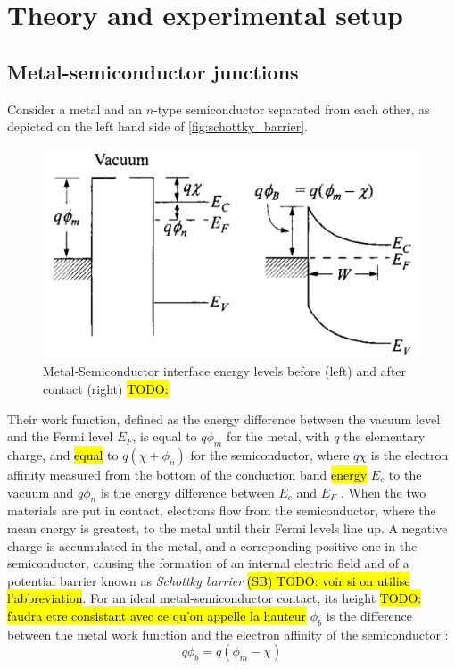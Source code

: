\section{Theory and experimental setup}
\subsection{Metal-semiconductor junctions}
Consider a metal and an $n$-type semiconductor separated from each other, as depicted on the left hand side of \autoref{fig:schottky_barrier}.
\begin{figure}[htbp]
    \centering
    \includegraphics[width=12cm]{figures/schottky_barrier.png}
    \caption{Metal-Semiconductor interface energy levels before (left) and after contact (right) \hl{TODO:} \cite{}}
    \label{fig:schottky_barrier}
\end{figure}
Their work function, defined as the energy difference between the vacuum level and the Fermi level $E_F$, is equal to $q \phi_m$ for the metal, with $q$ the elementary charge, and \hl{equal} to $q (\chi + \phi_n)$ for the semiconductor, where $q \chi$ is the electron affinity measured from the bottom of the conduction band \hl{energy} $E_c$ to the vacuum and $q\phi_n$ is the energy difference between $E_c$ and $E_F$ \cite{sze_physics_2007}.
When the two materials are put in contact, electrons flow from the semiconductor, where the mean energy is greatest, to the metal until their Fermi levels line up.
A negative charge is accumulated in the metal, and a correponding positive one in the semiconductor, causing the formation of an internal electric field and of a potential barrier known as \emph{Schottky barrier} \hl{(SB) TODO: voir si on utilise l'abbreviation}.
For an ideal metal-semiconductor contact, its height \hl{TODO: faudra etre consistant avec ce qu'on appelle la hauteur} $\phi_b$ is the difference between the metal work function and the electron affinity of the semiconductor \cite{sze_physics_2007}:
\begin{equation} \label{eq:barrier_height}
    q\phi_b = q(\phi_m - \chi)
\end{equation}

